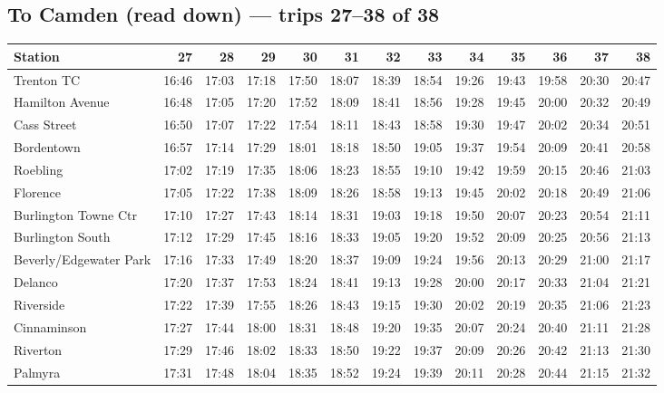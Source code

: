 \subsection*{To Camden (read down) --- trips 27--38 of 38}
\begin{center}\footnotesize\setlength{\tabcolsep}{3pt}\begin{tabular}{@{}lrrrrrrrrrrrr@{}}\toprule
Station & 27 & 28 & 29 & 30 & 31 & 32 & 33 & 34 & 35 & 36 & 37 & 38 \\\midrule
Trenton TC & 16:46 & 17:03 & 17:18 & 17:50 & 18:07 & 18:39 & 18:54 & 19:26 & 19:43 & 19:58 & 20:30 & 20:47 \\
Hamilton Avenue & 16:48 & 17:05 & 17:20 & 17:52 & 18:09 & 18:41 & 18:56 & 19:28 & 19:45 & 20:00 & 20:32 & 20:49 \\
Cass Street & 16:50 & 17:07 & 17:22 & 17:54 & 18:11 & 18:43 & 18:58 & 19:30 & 19:47 & 20:02 & 20:34 & 20:51 \\
Bordentown & 16:57 & 17:14 & 17:29 & 18:01 & 18:18 & 18:50 & 19:05 & 19:37 & 19:54 & 20:09 & 20:41 & 20:58 \\
Roebling & 17:02 & 17:19 & 17:35 & 18:06 & 18:23 & 18:55 & 19:10 & 19:42 & 19:59 & 20:15 & 20:46 & 21:03 \\
Florence & 17:05 & 17:22 & 17:38 & 18:09 & 18:26 & 18:58 & 19:13 & 19:45 & 20:02 & 20:18 & 20:49 & 21:06 \\
Burlington Towne Ctr & 17:10 & 17:27 & 17:43 & 18:14 & 18:31 & 19:03 & 19:18 & 19:50 & 20:07 & 20:23 & 20:54 & 21:11 \\
Burlington South & 17:12 & 17:29 & 17:45 & 18:16 & 18:33 & 19:05 & 19:20 & 19:52 & 20:09 & 20:25 & 20:56 & 21:13 \\
Beverly/Edgewater Park & 17:16 & 17:33 & 17:49 & 18:20 & 18:37 & 19:09 & 19:24 & 19:56 & 20:13 & 20:29 & 21:00 & 21:17 \\
Delanco & 17:20 & 17:37 & 17:53 & 18:24 & 18:41 & 19:13 & 19:28 & 20:00 & 20:17 & 20:33 & 21:04 & 21:21 \\
Riverside & 17:22 & 17:39 & 17:55 & 18:26 & 18:43 & 19:15 & 19:30 & 20:02 & 20:19 & 20:35 & 21:06 & 21:23 \\
Cinnaminson & 17:27 & 17:44 & 18:00 & 18:31 & 18:48 & 19:20 & 19:35 & 20:07 & 20:24 & 20:40 & 21:11 & 21:28 \\
Riverton & 17:29 & 17:46 & 18:02 & 18:33 & 18:50 & 19:22 & 19:37 & 20:09 & 20:26 & 20:42 & 21:13 & 21:30 \\
Palmyra & 17:31 & 17:48 & 18:04 & 18:35 & 18:52 & 19:24 & 19:39 & 20:11 & 20:28 & 20:44 & 21:15 & 21:32 \\

\end{tabular}
\end{center}
